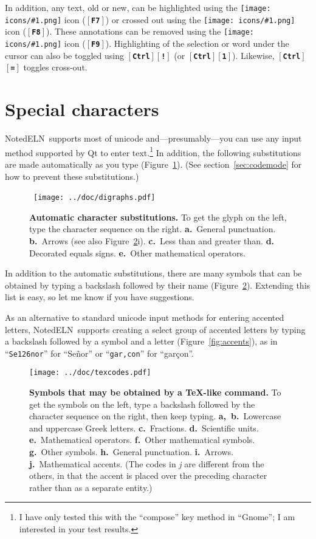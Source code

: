 \documentclass[11pt]{report}
\def\keystroke#1{$\left[\right.\!${\tt\bfseries #1}$\!\left.\right]$}
\def\key#1{\keystroke{#1}}
\def\keycombo#1#2{\keystroke{#1}\keystroke{#2}}
\def\keycontrol#1{\keycombo{Ctrl}{#1}}
\def\icon#1{\raise-2pt\hbox{\texttt{[image: icons/\#1.png]}}}
\newcommand{\NotedELN}{NotedELN} %
\begin{document}
In addition, any text, old or new, can be highlighted using the
\icon{highlight} icon (\key{F7}) or crossed out using the
\icon{strikeout} icon (\key{F8}). These
annotations can be removed using the \icon{plain} icon
(\key{F9}). Highlighting of the selection or word under the cursor can
also be toggled using \keycontrol{!} (or \keycontrol{1}). Likewise,
\keycontrol{=} toggles cross-out.

\section{Special characters}

\NotedELN\ supports most of unicode and---presumably---you can use any input
method supported by Qt to enter text.\footnote{I have only tested this
  with the ``compose'' key method in ``Gnome''; I am interested in
  your test results.} In addition, the following substitutions are
made automatically as you type (Figure~\ref{fig:charsubst}). (See
section~\ref{sec:codemode} for how to prevent these substitutions.)

\begin{figure}[t]
\noindent~\hfill\texttt{[image: ../doc/digraphs.pdf]}\hfill~\vspace{-40pt}

\caption{{\bf Automatic character substitutions.} To get the glyph on
  the left, type the character sequence on the right. {\bf a.}~General
  punctuation. {\bf b.}~Arrows (see also Figure~\ref{fig:texcodes}i). {\bf c.}~Less than and greater
  than. {\bf d.} Decorated equals signs. {\bf e.}~Other mathematical
  operators.}\label{fig:charsubst}
\end{figure}

In addition to the automatic substitutions, there are many symbols
that can be obtained by typing a backslash followed by their name
(Figure~\ref{fig:texcodes}).  Extending this list
is easy, so let me know if you have suggestions.

As an alternative to standard unicode input methods for entering
accented letters, \NotedELN\ supports creating a select group of accented
letters by typing a backslash followed by a symbol and a letter
(Figure~\ref{fig:accents}), as in ``{\tt Se\char126nor}'' for
``Se\~nor'' or ``{\tt gar,con}'' for ``gar\c{c}on''.

\begin{figure}
\noindent\texttt{[image: ../doc/texcodes.pdf]}\vspace{-7pt}

\caption{{\bf Symbols that may be obtained by a TeX-like command.} To
  get the symbols on the left, type a backslash followed by the character sequence on the
  right, then keep typing.
  {\bf a,~b.}~Lowercase and uppercase Greek letters.
  {\bf c.}~Fractions.
  {\bf d.}~Scientific units.
  {\bf e.}~Mathematical operators.
 {\bf f.}~Other mathematical symbols.
  {\bf g.}~Other symbols.
  {\bf h.}~General punctuation.
  {\bf i.}~Arrows.
  {\bf j.}~Mathematical accents.
  (The codes in \emph{j} are
  different from the others, in that the accent is placed over the
  preceding character rather than as a separate
  entity.)}\label{fig:texcodes}
\end{figure}
\end{document}
